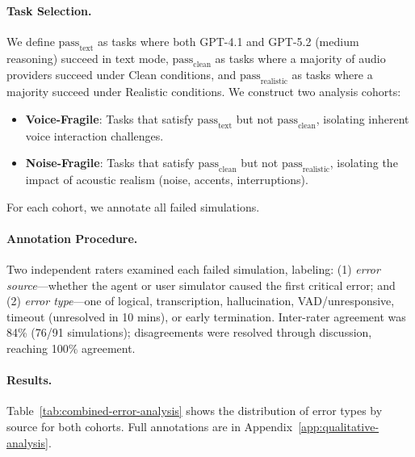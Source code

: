 \paragraph{Task Selection.} We define $\text{pass}_{\text{text}}$ as tasks where both GPT-4.1 and GPT-5.2 (medium reasoning) succeed in text mode, $\text{pass}_{\text{clean}}$ as tasks where a majority of audio providers succeed under Clean conditions, and $\text{pass}_{\text{realistic}}$ as tasks where a majority succeed under Realistic conditions. We construct two analysis cohorts:
\begin{itemize}[nosep,leftmargin=*]
    \item \textbf{Voice-Fragile}: Tasks that satisfy $\text{pass}_{\text{text}}$ but not $\text{pass}_{\text{clean}}$, isolating inherent voice interaction challenges.
    \item \textbf{Noise-Fragile}: Tasks that satisfy $\text{pass}_{\text{clean}}$ but not $\text{pass}_{\text{realistic}}$, isolating the impact of acoustic realism (noise, accents, interruptions).
\end{itemize}
For each cohort, we annotate all failed simulations.

\paragraph{Annotation Procedure.} Two independent raters examined each failed simulation, labeling: (1) \textit{error source}---whether the agent or user simulator caused the first critical error; and (2) \textit{error type}---one of logical, transcription, hallucination, VAD/unresponsive, timeout (unresolved in 10 mins), or early termination. Inter-rater agreement was 84\% (76/91 simulations); disagreements were resolved through discussion, reaching 100\% agreement.

\paragraph{Results.} Table~\ref{tab:combined-error-analysis} shows the distribution of error types by source for both cohorts. Full annotations are in Appendix~\ref{app:qualitative-analysis}.

\begin{table}[h]
\caption{Error analysis: distribution of error types by source. Agent errors dominate in both cohorts (79\% and 90\%).}
\label{tab:combined-error-analysis}
\centering
\begin{small}
\resizebox{0.85\columnwidth}{!}{%

}
\end{small}
\end{table}

